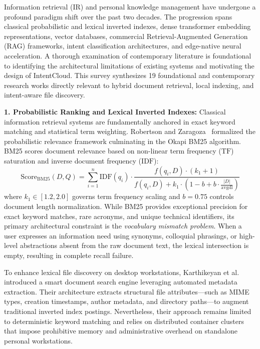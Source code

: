 \documentclass[a4paper,12pt]{article}
\begin{document}
Information retrieval (IR) and personal knowledge management have undergone a profound paradigm shift over the past two decades. The progression spans classical probabilistic and lexical inverted indexes, dense transformer embedding representations, vector databases, commercial Retrieval-Augmented Generation (RAG) frameworks, intent classification architectures, and edge-native neural acceleration. A thorough examination of contemporary literature is foundational to identifying the architectural limitations of existing systems and motivating the design of IntentCloud. This survey synthesizes 19 foundational and contemporary research works directly relevant to hybrid document retrieval, local indexing, and intent-aware file discovery.

\vspace{0.8em}
\noindent\textbf{1. Probabilistic Ranking and Lexical Inverted Indexes:}
Classical information retrieval systems are fundamentally anchored in exact keyword matching and statistical term weighting. Robertson and Zaragoza~\cite{robertson2009probabilistic} formalized the probabilistic relevance framework culminating in the Okapi BM25 algorithm. BM25 scores document relevance based on non-linear term frequency ($\text{TF}$) saturation and inverse document frequency ($\text{IDF}$):
\begin{equation}
\text{Score}_{\text{BM25}}(D, Q) = \sum_{i=1}^{n} \text{IDF}(q_i) \cdot \frac{f(q_i, D) \cdot (k_1 + 1)}{f(q_i, D) + k_1 \cdot \left(1 - b + b \cdot \frac{|D|}{\text{avgdl}}\right)}
\end{equation}
where $k_1 \in [1.2, 2.0]$ governs term frequency scaling and $b = 0.75$ controls document length normalization. While BM25 provides exceptional precision for exact keyword matches, rare acronyms, and unique technical identifiers, its primary architectural constraint is the \textit{vocabulary mismatch problem}. When a user expresses an information need using synonyms, colloquial phrasings, or high-level abstractions absent from the raw document text, the lexical intersection is empty, resulting in complete recall failure.

To enhance lexical file discovery on desktop workstations, Karthikeyan et al.~\cite{karthikeyan2025smart} introduced a smart document search engine leveraging automated metadata extraction. Their architecture extracts structural file attributes---such as MIME types, creation timestamps, author metadata, and directory paths---to augment traditional inverted index postings. Nevertheless, their approach remains limited to deterministic keyword matching and relies on distributed container clusters that impose prohibitive memory and administrative overhead on standalone personal workstations.
\end{document}
